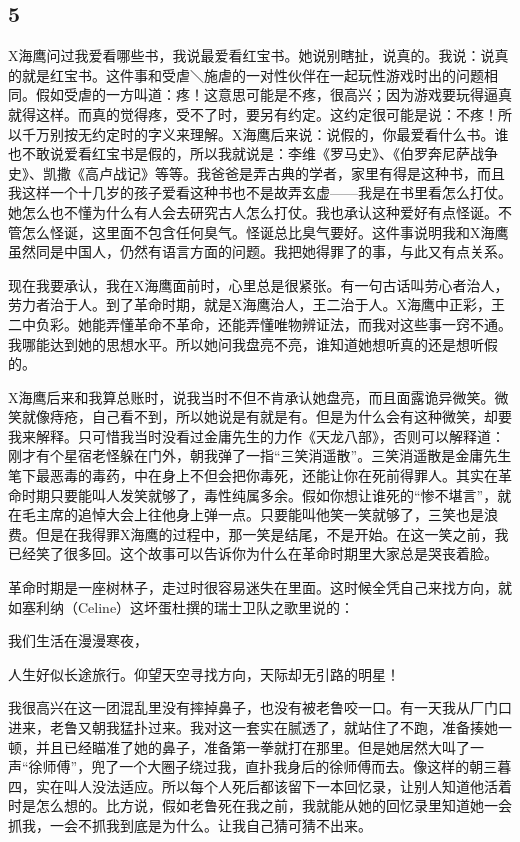 \subsection{5} 

X海鹰问过我爱看哪些书，我说最爱看红宝书。她说别瞎扯，说真的。我说：说真的就是红宝书。这件事和受虐＼施虐的一对性伙伴在一起玩性游戏时出的问题相同。假如受虐的一方叫道：疼！这意思可能是不疼，很高兴；因为游戏要玩得逼真就得这样。而真的觉得疼，受不了时，要另有约定。这约定很可能是说：不疼！所以千万别按无约定时的字义来理解。X海鹰后来说：说假的，你最爱看什么书。谁也不敢说爱看红宝书是假的，所以我就说是：李维《罗马史》、《伯罗奔尼萨战争史》、凯撒《高卢战记》等等。我爸爸是弄古典的学者，家里有得是这种书，而且我这样一个十几岁的孩子爱看这种书也不是故弄玄虚——我是在书里看怎么打仗。她怎么也不懂为什么有人会去研究古人怎么打仗。我也承认这种爱好有点怪诞。不管怎么怪诞，这里面不包含任何臭气。怪诞总比臭气要好。这件事说明我和X海鹰虽然同是中国人，仍然有语言方面的问题。我把她得罪了的事，与此又有点关系。 

现在我要承认，我在X海鹰面前时，心里总是很紧张。有一句古话叫劳心者治人，劳力者治于人。到了革命时期，就是X海鹰治人，王二治于人。X海鹰中正彩，王二中负彩。她能弄懂革命不革命，还能弄懂唯物辨证法，而我对这些事一窍不通。我哪能达到她的思想水平。所以她问我盘亮不亮，谁知道她想听真的还是想听假的。 

X海鹰后来和我算总账时，说我当时不但不肯承认她盘亮，而且面露诡异微笑。微笑就像痔疮，自己看不到，所以她说是有就是有。但是为什么会有这种微笑，却要我来解释。只可惜我当时没看过金庸先生的力作《天龙八部》，否则可以解释道：刚才有个星宿老怪躲在门外，朝我弹了一指“三笑消遥散”。三笑消遥散是金庸先生笔下最恶毒的毒药，中在身上不但会把你毒死，还能让你在死前得罪人。其实在革命时期只要能叫人发笑就够了，毒性纯属多余。假如你想让谁死的“惨不堪言”，就在毛主席的追悼大会上往他身上弹一点。只要能叫他笑一笑就够了，三笑也是浪费。但是在我得罪X海鹰的过程中，那一笑是结尾，不是开始。在这一笑之前，我已经笑了很多回。这个故事可以告诉你为什么在革命时期里大家总是哭丧着脸。 

革命时期是一座树林子，走过时很容易迷失在里面。这时候全凭自己来找方向，就如塞利纳（Celine）这坏蛋杜撰的瑞士卫队之歌里说的： 

我们生活在漫漫寒夜， 

人生好似长途旅行。仰望天空寻找方向，天际却无引路的明星！ 

我很高兴在这一团混乱里没有摔掉鼻子，也没有被老鲁咬一口。有一天我从厂门口进来，老鲁又朝我猛扑过来。我对这一套实在腻透了，就站住了不跑，准备揍她一顿，并且已经瞄准了她的鼻子，准备第一拳就打在那里。但是她居然大叫了一声“徐师傅”，兜了一个大圈子绕过我，直扑我身后的徐师傅而去。像这样的朝三暮四，实在叫人没法适应。所以每个人死后都该留下一本回忆录，让别人知道他活着时是怎么想的。比方说，假如老鲁死在我之前，我就能从她的回忆录里知道她一会抓我，一会不抓我到底是为什么。让我自己猜可猜不出来。 

